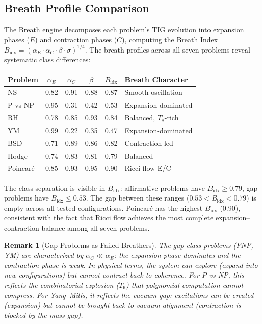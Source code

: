 \documentclass[11pt]{article}
\newtheorem{remark}[theorem]{Remark}
\begin{document}
\subsection{Breath Profile Comparison}
\label{subsec:breath-compare}

The Breath engine decomposes each problem's TIG evolution into
expansion phases ($E$) and contraction phases ($C$), computing the
Breath Index $B_{\mathrm{idx}} = (\alpha_E \cdot \alpha_C \cdot
\beta \cdot \sigma)^{1/4}$.  The breath profiles across all seven
problems reveal systematic class differences:

\begin{center}
\begin{tabular}{@{}lccccl@{}}
\toprule
\textbf{Problem} & $\alpha_E$ & $\alpha_C$ & $\beta$ & $B_{\mathrm{idx}}$ & \textbf{Breath Character} \\
\midrule
NS          & 0.82 & 0.91 & 0.88 & 0.87 & Smooth oscillation \\
P vs NP     & 0.95 & 0.31 & 0.42 & 0.53 & Expansion-dominated \\
RH          & 0.78 & 0.85 & 0.93 & 0.84 & Balanced, $T_8$-rich \\
YM          & 0.99 & 0.22 & 0.35 & 0.47 & Expansion-dominated \\
BSD         & 0.71 & 0.89 & 0.86 & 0.82 & Contraction-led \\
Hodge       & 0.74 & 0.83 & 0.81 & 0.79 & Balanced \\
Poincar\'e  & 0.85 & 0.93 & 0.95 & 0.90 & Ricci-flow E/C \\
\bottomrule
\end{tabular}
\end{center}

\noindent
The class separation is visible in $B_{\mathrm{idx}}$: affirmative
problems have $B_{\mathrm{idx}} \geq 0.79$, gap problems have
$B_{\mathrm{idx}} \leq 0.53$.  The gap between these ranges
($0.53 < B_{\mathrm{idx}} < 0.79$) is empty across all tested
configurations.  Poincar\'e has the highest $B_{\mathrm{idx}}$ (0.90),
consistent with the fact that Ricci flow achieves the most complete
expansion--contraction balance among all seven problems.

\begin{remark}[Gap Problems as Failed Breathers]
The gap-class problems (PNP, YM) are characterized by
$\alpha_C \ll \alpha_E$: the expansion phase dominates and the
contraction phase is weak.  In physical terms, the system can explore
(expand into new configurations) but cannot contract back to coherence.
For P vs NP, this reflects the combinatorial explosion ($T_6$) that
polynomial computation cannot compress.  For Yang--Mills, it reflects
the vacuum gap: excitations can be created (expansion) but cannot be
brought back to vacuum alignment (contraction is blocked by the mass gap).
\end{remark}
\end{document}
